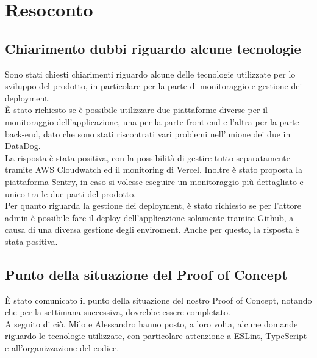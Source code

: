 \section{Resoconto}
\subsection{Chiarimento dubbi riguardo alcune tecnologie}

Sono stati chiesti chiarimenti riguardo alcune delle tecnologie utilizzate per lo sviluppo del prodotto, in particolare per la parte di monitoraggio e gestione dei deployment.\\

È stato richiesto se è possibile utilizzare due piattaforme diverse per il monitoraggio dell'applicazione, una per la parte front-end e l'altra per la parte back-end, dato che sono stati riscontrati vari problemi nell'unione dei due in DataDog. \\
La risposta è stata positiva, con la possibilità di gestire tutto separatamente tramite AWS Cloudwatch ed il monitoring di Vercel. Inoltre è stato proposta la piattaforma Sentry, in caso si volesse eseguire un monitoraggio più dettagliato e unico tra le due parti del prodotto.\\

Per quanto riguarda la gestione dei deployment, è stato richiesto se per l'attore admin è possibile fare il deploy dell'applicazione solamente tramite Github, a causa di una diversa gestione degli enviroment. Anche per questo, la risposta è stata positiva.
  
\subsection{Punto della situazione del Proof of Concept}

È stato comunicato il punto della situazione del nostro Proof of Concept, notando che per la settimana successiva, dovrebbe essere completato. \\A seguito di ciò, Milo e Alessandro hanno posto, a loro volta, alcune domande riguardo le tecnologie utilizzate, con particolare attenzione a ESLint, TypeScript e all'organizzazione del codice.
